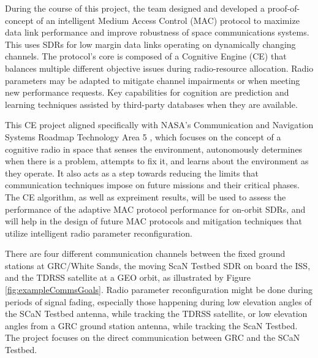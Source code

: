 	\par During the course of this project, the team designed and developed a proof-of-concept of an intelligent Medium Access Control (MAC) protocol to maximize data link performance and improve robustness of space communications systems. This uses SDRs for low margin data links operating on dynamically changing channels. The protocol's core is composed of a Cognitive Engine (CE) that balances multiple different objective issues during radio-resource allocation. Radio parameters may be adapted to mitigate channel impairments or when meeting new performance requests. Key capabilities for cognition are prediction and learning techniques assisted by third-party databases when they are available.  
	\par This CE project aligned specifically with NASA's Communication and Navigation Systems Roadmap Technology Area 5 \cite{nasaTA5}, which focuses on the concept of a cognitive radio in space that senses the environment, autonomously determines when there is a problem, attempts to fix it, and learns about the environment as they operate. It also acts as a step towards reducing the limits that communication techniques impose on future missions and their critical phases. The CE algorithm, as well as expreiment results, will be used to assess the performance of the adaptive MAC protocol performance for on-orbit SDRs, and will help in the design of future MAC protocols and mitigation techniques that utilize intelligent radio parameter reconfiguration. 
	\par There are four different communication channels between the fixed ground stations at GRC/White Sands, the moving ScaN Testbed SDR on board the ISS, and the TDRSS satellite at a GEO orbit, as illustrated by Figure \ref{fig:exampleCommsGoals}. Radio parameter reconfiguration might be done during periods of signal fading, especially those happening during low elevation angles of the SCaN Testbed antenna, while tracking the TDRSS satellite, or low elevation angles from a GRC ground station antenna, while tracking the ScaN Testbed. The project focuses on the direct communication between GRC and the SCaN Testbed.
	\clearpage
